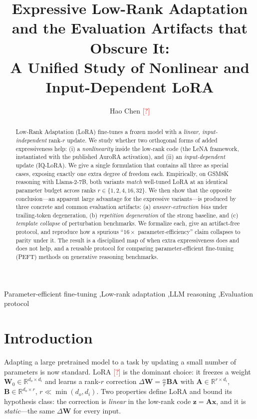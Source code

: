 \documentclass[preprint,11pt]{elsarticle}
\newcommand{\todo}[1]{\textcolor{red}{[\textbf{TODO}: #1]}}
\newcommand{\todocite}{\textcolor{red}{[?]}}
\newcommand{\R}{\mathbb{R}}
\newcommand{\x}{\bm{x}}
\newcommand{\z}{\bm{z}}
\newcommand{\W}{\bm{W}}
\newcommand{\A}{\bm{A}}
\newcommand{\B}{\bm{B}}
\begin{document}
\begin{frontmatter}
\title{Expressive Low-Rank Adaptation and the Evaluation Artifacts that Obscure It:\\ A Unified Study of Nonlinear and Input-Dependent LoRA}

\author{Hao Chen \todocite}
\address{\todo{affiliation}}

\begin{abstract}
Low-Rank Adaptation (LoRA) fine-tunes a frozen model with a \emph{linear, input-independent} rank-$r$ update. We study
whether two orthogonal forms of added expressiveness help: (i) a \emph{nonlinearity} inside the low-rank code (the LeNA
framework, instantiated with the published AuroRA activation), and (ii) an \emph{input-dependent} update (IQ-LoRA). We give
a single formulation that contains all three as special cases, exposing exactly one extra degree of freedom each. Empirically, on GSM8K reasoning with Llama-2-7B, both
variants \emph{match} well-tuned LoRA at an identical parameter budget across ranks $r\in\{1,2,4,16,32\}$. We then show
that the opposite conclusion---an apparent large advantage for the expressive variants---is produced by three concrete and
common evaluation artifacts: (a) \emph{answer-extraction bias} under trailing-token degeneration, (b) \emph{repetition
degeneration} of the strong baseline, and (c) \emph{template collapse} of perturbation benchmarks. We formalize each,
give an artifact-free protocol, and reproduce how a spurious ``$16\times$ parameter-efficiency'' claim collapses to parity
under it. The result is a disciplined map of when extra expressiveness does and does not help, and a reusable protocol for
comparing parameter-efficient fine-tuning (PEFT) methods on generative reasoning benchmarks.
\end{abstract}
\begin{keyword}
Parameter-efficient fine-tuning \sep Low-rank adaptation \sep LLM reasoning \sep Evaluation protocol
\end{keyword}
\end{frontmatter}

\section{Introduction}
Adapting a large pretrained model to a task by updating a small number of parameters is now standard. LoRA
\todocite{} is the dominant choice: it freezes a weight $\W_0\in\R^{d_o\times d_i}$ and learns a rank-$r$ correction
$\Delta\W=\tfrac{\alpha}{r}\B\A$ with $\A\in\R^{r\times d_i}$, $\B\in\R^{d_o\times r}$, $r\ll\min(d_o,d_i)$. Two properties
define LoRA and bound its hypothesis class: the correction is \emph{linear} in the low-rank code $\z=\A\x$, and it is
\emph{static}---the same $\Delta\W$ for every input.
\end{document}
